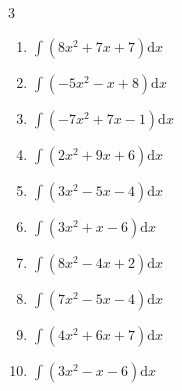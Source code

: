 \begin{multicols}{3}
\begin{enumerate}

\columnbreak %

\resetques

  \item $\displaystyle \int \left( 8x^{2}+7x+7 \right) \mathrm{d}x$


  \item $\displaystyle \int \left( -5x^{2}-x+8 \right) \mathrm{d}x$


  \item $\displaystyle \int \left( -7x^{2}+7x-1 \right) \mathrm{d}x$


  \item $\displaystyle \int \left( 2x^{2}+9x+6 \right) \mathrm{d}x$


  \item $\displaystyle \int \left( 3x^{2}-5x-4 \right) \mathrm{d}x$


  \item $\displaystyle \int \left( 3x^{2}+x-6 \right) \mathrm{d}x$


  \item $\displaystyle \int \left( 8x^{2}-4x+2 \right) \mathrm{d}x$


  \item $\displaystyle \int \left( 7x^{2}-5x-4 \right) \mathrm{d}x$


  \item $\displaystyle \int \left( 4x^{2}+6x+7 \right) \mathrm{d}x$


  \item $\displaystyle \int \left( 3x^{2}-x-6 \right) \mathrm{d}x$


\end{enumerate}
\end{multicols}
